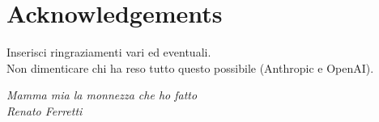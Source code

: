 \testocapitolo{}
\chapter*{Acknowledgements}
Inserisci ringraziamenti vari ed eventuali.\\
Non dimenticare chi ha reso tutto questo possibile (Anthropic e OpenAI).

\vspace{3cm}

\begin{flushright}
\textit{Mamma mia la monnezza che ho fatto \\ Renato Ferretti}
\end{flushright}